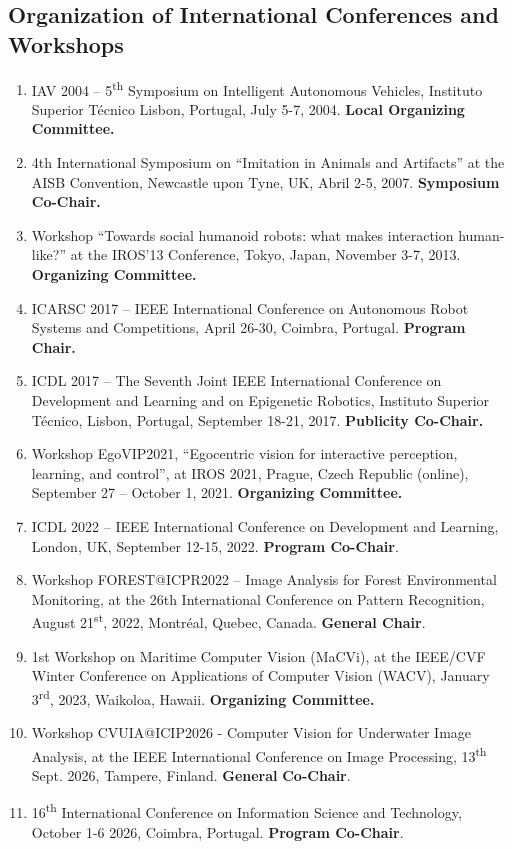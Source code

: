 \documentclass[
]{article}
\begin{document}
\subsection{Organization of International Conferences and
Workshops}\label{organization-of-international-conferences-and-workshops}

\begin{enumerate}
\def\labelenumi{\arabic{enumi}.}
\item
  IAV 2004 -- 5\textsuperscript{th} Symposium on Intelligent Autonomous
  Vehicles, Instituto Superior Técnico Lisbon, Portugal, July 5-7, 2004.
  \textbf{Local Organizing Committee.}
\item
  4th International Symposium on ``Imitation in Animals and Artifacts''
  at the AISB Convention, Newcastle upon Tyne, UK,
  Abril 2-5, 2007. \textbf{Symposium Co-Chair.}
\item
  Workshop ``Towards social humanoid robots: what makes interaction
  human-like?'' at the IROS'13 Conference, Tokyo, Japan, November 3-7,
  2013. \textbf{Organizing Committee.}
\item
  ICARSC 2017 -- IEEE International Conference on Autonomous Robot
  Systems and Competitions, April 26-30, Coimbra, Portugal.
  \textbf{Program Chair.}
\item
  ICDL 2017 -- The Seventh Joint IEEE International Conference on
  Development and Learning and on Epigenetic Robotics, Instituto
  Superior Técnico, Lisbon, Portugal, September 18-21, 2017.
  \textbf{Publicity Co-Chair.}
\item
  Workshop EgoVIP2021, ``Egocentric vision for interactive perception,
  learning, and control'', at IROS 2021, Prague, Czech Republic
  (online), September 27 -- October 1, 2021. \textbf{Organizing
  Committee.}
\item
  ICDL 2022 -- IEEE International Conference on Development and
  Learning, London, UK, September 12-15, 2022. \textbf{Program
  Co-Chair}.
\item
  Workshop FOREST@ICPR2022 -- Image Analysis for Forest Environmental
  Monitoring, at the 26th International Conference on Pattern
  Recognition, August 21\textsuperscript{st}, 2022, Montréal, Quebec,
  Canada. \textbf{General Chair}.
\item
  1st Workshop on Maritime Computer Vision (MaCVi), at the IEEE/CVF
  Winter Conference on Applications of Computer Vision (WACV), January
  3\textsuperscript{rd}, 2023, Waikoloa, Hawaii. \textbf{Organizing
  Committee.}
\item
  Workshop CVUIA@ICIP2026 - Computer Vision for Underwater Image
  Analysis, at the IEEE International Conference on Image Processing,
  13\textsuperscript{th} Sept. 2026, Tampere, Finland. \textbf{General}
  \textbf{Co-Chair}.
\item
  16\textsuperscript{th} International Conference on Information Science
  and Technology, October 1-6 2026, Coimbra, Portugal. \textbf{Program
  Co-Chair}.
\end{enumerate}
\end{document}
